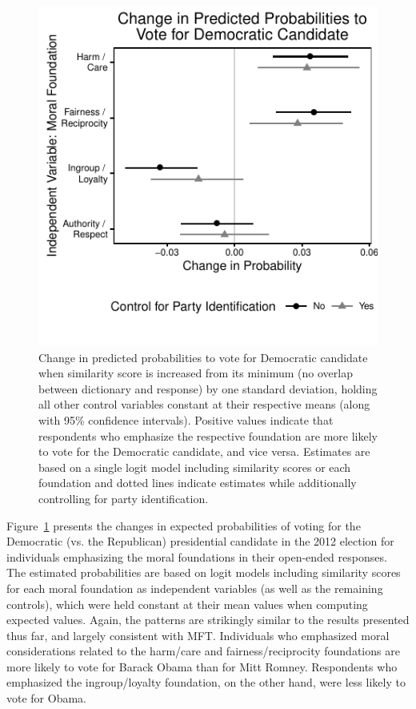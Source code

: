 \documentclass[12pt]{article}
\begin{document}
\begin{figure}[ht]\centering
\includegraphics[scale=.9]{../calc/fig/logit_vote.pdf}
\caption{Change in predicted probabilities to vote for Democratic candidate when similarity score is increased from its minimum (no overlap between dictionary and response) by one standard deviation, holding all other control variables constant at their respective means (along with 95\% confidence intervals). Positive values indicate that respondents who emphasize the respective foundation are more likely to vote for the Democratic candidate, and vice versa. Estimates are based on a single logit model including similarity scores or each foundation and dotted lines indicate estimates while additionally controlling for party identification. %
}\label{fig:logit_vote}
\end{figure}

Figure~\ref{fig:logit_vote} presents the changes in expected probabilities of voting for the Democratic (vs. the Republican) presidential candidate in the 2012 election for individuals emphasizing the moral foundations in their open-ended responses. The estimated probabilities are based on logit models including similarity scores for each moral foundation as independent variables (as well as  the remaining controls), which were held constant at their mean values when computing expected values. Again, the patterns are strikingly similar to the results presented thus far, and largely consistent with MFT. Individuals who emphasized moral considerations related to the harm/care and fairness/reciprocity foundations are more likely to vote for Barack Obama than for Mitt Romney. Respondents who emphasized the ingroup/loyalty foundation, on the other hand, were less likely to vote for Obama. 
\end{document}
